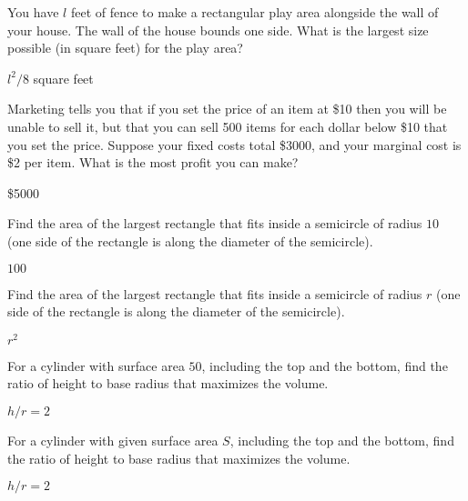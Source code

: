 \begin{exercises}
\begin{exercise}
You have $l$ feet of fence to make a rectangular play area alongside the
wall of your house.  The wall of the house bounds one side.  What is the
largest size possible (in square feet) for the play area?
\begin{answer} $l^2/8$ square feet
\end{answer}\end{exercise}

\begin{exercise}
Marketing tells you that if you set the price of an item at \$10
then you will be unable to sell it, but that you can sell 500 items for
each dollar below \$10 that you set the price.  Suppose your fixed costs total
\$3000, and your marginal cost is \$2 per item.  What is the most profit
you can make?
\label{ex:manufacturing}
\begin{answer} \$5000
\end{answer}\end{exercise}

\begin{exercise}
Find the area of the largest rectangle that fits inside a semicircle of
radius $10$ (one side of the rectangle is along the diameter of the
semicircle).
\begin{answer} $100$
\end{answer}\end{exercise}

\begin{exercise}
Find the area of the largest rectangle that fits inside a semicircle of
radius $r$ (one side of the rectangle is along the diameter of the
semicircle).
\begin{answer} $r^2$
\end{answer}\end{exercise}

\begin{exercise}
For a cylinder with surface area $50$, including 
the top and the bottom, find the ratio of height to
base radius that maximizes the volume.
\begin{answer} $h/r=2$
\end{answer}\end{exercise}

\begin{exercise}
For a cylinder with given surface area $S$, including 
the top and the bottom, find the ratio of height to
base radius that maximizes the volume.
\begin{answer} $h/r=2$
\end{answer}\end{exercise}


\end{exercises}
